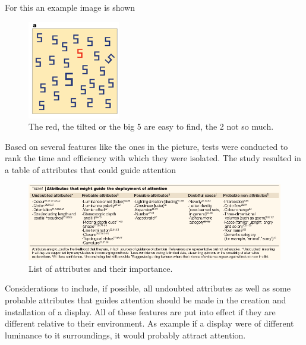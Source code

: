 For this an example image is shown
\begin{figure}[H]
    	\centering
    	\includegraphics[width=0.4\linewidth]{figure/Analysis/natureFig1.png}
    	\caption{The red, the tilted or the big 5 are easy to find, the 2 not so much\cite{Wolfe2004}.}
    	\label{fig:hard2find}
    \end{figure}

Based on several features like the ones in the picture, tests were conducted to rank the time and efficiency with which they were isolated. The study resulted in a table of attributes that could guide attention

\begin{figure}[H]
    	\centering
    	\includegraphics[width=0.9\linewidth]{figure/Analysis/attributes2find.png}
    	\caption{List of attributes and their importance\cite{Wolfe2004}.}
    	\label{fig:attributes2find}
    \end{figure}
Considerations to include, if possible, all undoubted attributes as well as some probable attributes that guides attention should be made in the creation and installation of a display. All of these features are put into effect if they are different relative to their environment. As example if a display were of different luminance to it surroundings, it would probably attract attention.

